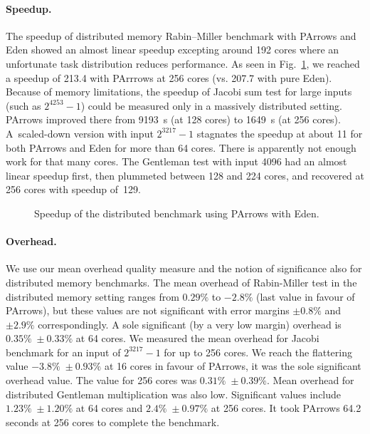 \paragraph{Speedup.}
The speedup of distributed memory Rabin--Miller benchmark with PArrows and Eden showed an almost 
linear speedup excepting around 192 cores where an unfortunate task distribution reduces performance.
As seen in Fig.~\ref{fig:rabinMillerDistSpeedup}, we reached a speedup of 213.4 with PArrrows at 256 cores (vs. 207.7 with pure Eden). Because of memory limitations, the speedup of Jacobi sum test for large inputs (such as $2^{4253}-1$) could be measured only in a massively distributed setting. PArrows improved there from \SI{9193}{\second} (at 128 cores) to \SI{1649}{\second} (at 256 cores). A~scaled-down version with input $2^{3217}-1$ stagnates the speedup at about 11 for both PArrows and Eden for more than 64 cores. There is apparently not enough work for that many cores. The Gentleman test with input 4096 had an almost linear speedup first, then plummeted between 128 and 224 cores, and recovered at 256 cores with speedup of~129.

\begin{figure}[ht]
	\centering
	\caption[Speedup distributed Rabin--Miller]{Speedup of the distributed \rmtest benchmark using PArrows with Eden.}
	\label{fig:rabinMillerDistSpeedup}
\end{figure}

\paragraph{Overhead.}
We use our mean overhead quality measure and the notion of significance also for distributed memory benchmarks. The mean overhead of Rabin-Miller test in the distributed memory setting ranges from $0.29\%$ to $-2.8\%$ (last value in favour of PArrows), but these values are not significant with error margins $\pm 0.8\%$ and $\pm 2.9\%$ correspondingly. A sole significant (by a very low margin) overhead is $0.35\% \; \pm 0.33\%$ at 64 cores.
We measured the mean overhead for Jacobi benchmark for an input of $2^{3217}-1$ for up to 256 cores.
We reach the flattering value $-3.8\% \; \pm 0.93\%$ at 16 cores in favour of PArrows, it was the sole significant overhead value. The  value for 256 cores was $0.31\% \; \pm 0.39\%$.
Mean overhead for distributed Gentleman multiplication was also low. Significant values include $1.23\% \; \pm 1.20\%$ at 64 cores and $2.4\% \; \pm 0.97\%$ at 256 cores. It took PArrows 64.2 seconds at 256 cores to complete the benchmark.

